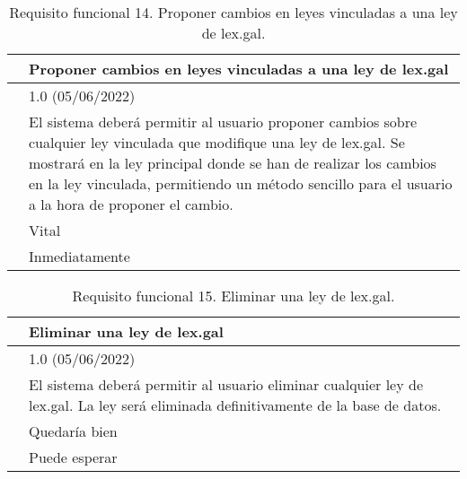 \begin{table}[H]
\begin{center}
\begin{tabular}{|p{3cm}|p{10cm}|} \hline
\centering {\bf FRQ-14} & Proponer cambios en leyes vinculadas a una ley de lex.gal  \\ \hline\hline
\centering {\bf Versión} & 1.0 (05/06/2022) \\ \hline
\centering {\bf Descripción} & El sistema deberá permitir al usuario proponer cambios sobre cualquier ley vinculada que modifique una ley de lex.gal. Se mostrará en la ley principal donde se han de realizar los cambios en la ley vinculada, permitiendo un método sencillo para el usuario a la hora de proponer el cambio.  \\ \hline
\centering {\bf Importancia} & Vital \\ \hline
\centering {\bf Urgencia} & Inmediatamente \\ \hline
\end{tabular}
\caption{Requisito funcional 14. Proponer cambios en leyes vinculadas a una ley de lex.gal.}
\label{enlaceFRQ14}
\end{center}
\end{table}

\begin{table}[H]
\begin{center}
\begin{tabular}{|p{3cm}|p{10cm}|} \hline
\centering {\bf FRQ-15} & Eliminar una ley de lex.gal  \\ \hline\hline
\centering {\bf Versión} & 1.0 (05/06/2022) \\ \hline
\centering {\bf Descripción} & El sistema deberá permitir al usuario eliminar cualquier ley de lex.gal. La ley será eliminada definitivamente de la base de datos. \\ \hline
\centering {\bf Importancia} & Quedaría bien \\ \hline
\centering {\bf Urgencia} & Puede esperar \\ \hline
\end{tabular}
\caption{Requisito funcional 15. Eliminar una ley de lex.gal.}
\label{enlaceFRQ15}
\end{center}
\end{table}